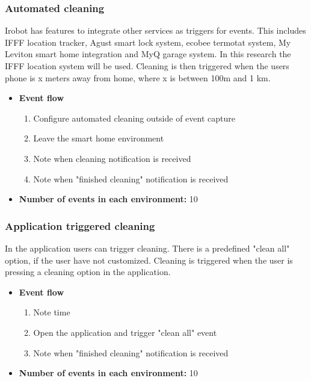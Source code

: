 \subsubsection{Automated cleaning}
Irobot has features to integrate other services as triggers for events. This includes IFFF location tracker, Agust smart lock system, ecobee termotat system, My Leviton smart home integration and MyQ garage system. In this research the IFFF location system will be used. Cleaning is then triggered when the users phone is x meters away from home, where x is between 100m and 1 km. 

\begin{itemize}
    \item \textbf{Event flow} \begin{enumerate}
                                    \item Configure automated cleaning outside of event capture
                                    \item Leave the smart home environment
                                    \item Note when cleaning notification is received
                                    \item Note when "finished cleaning" notification is received
                                \end{enumerate}
    \item \textbf{Number of events in each environment:} 10
\end{itemize}

\subsubsection{Application triggered cleaning}
In the application users can trigger cleaning. There is a predefined "clean all" option, if the user have not customized. Cleaning is triggered when the user is pressing a cleaning option in the application.

\begin{itemize}
    \item \textbf{Event flow} \begin{enumerate}
                                    \item Note time
                                    \item Open the application and trigger "clean all" event
                                    \item Note when "finished cleaning" notification is received
                                \end{enumerate}
    \item \textbf{Number of events in each environment:} 10
\end{itemize}

